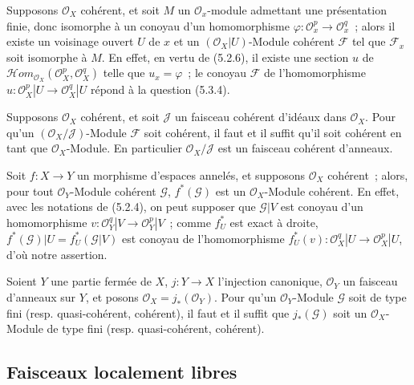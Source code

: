 \begin{env}[5.3.9]
\label{0.5.3.9-fr}
Supposons $\mathcal{O}_X$ cohérent, et soit $M$ un $\mathcal{O}_x$-module
admettant une présentation finie, donc isomorphe à un conoyau d'un
homomorphisme $\varphi:\mathcal{O}_x^p\to\mathcal{O}_x^q$~; alors il existe un
voisinage ouvert $U$ de $x$ et un $(\mathcal{O}_X|U)$-Module cohérent
$\mathcal{F}$ tel que $\mathcal{F}_x$ soit isomorphe à $M$. En effet, en vertu
de (5.2.6), il existe une section $u$ de
$\mathcal{H}\!om_{\mathcal{O}_X}(\mathcal{O}_X^p,\mathcal{O}_X^q)$ telle que $u_x=\varphi$~; le conoyau
$\mathcal{F}$ de l'homomorphisme
$u:\mathcal{O}_X^p|U\to\mathcal{O}_X^q|U$ répond à la question (5.3.4).
\end{env}

\begin{env}[5.3.10]
\label{0.5.3.10-fr}
Supposons $\mathcal{O}_X$ cohérent, et soit $\mathcal{J}$ un faisceau cohérent
d'idéaux dans $\mathcal{O}_X$. Pour qu'un
$(\mathcal{O}_X/\mathcal{J})$-Module $\mathcal{F}$ soit cohérent, il faut et il
suffit qu'il soit cohérent en tant que $\mathcal{O}_X$-Module. En particulier
$\mathcal{O}_X/\mathcal{J}$ est un faisceau cohérent d'anneaux.
\end{env}

\begin{env}[5.3.11]
\label{0.5.3.11-fr}
Soit $f:X\to Y$ un morphisme d'espaces annelés, et supposons
$\mathcal{O}_X$ cohérent~; alors, pour tout $\mathcal{O}_Y$-Module cohérent
$\mathcal{G}$, $f^*(\mathcal{G})$ est un $\mathcal{O}_X$-Module cohérent. En
effet, avec les notations de (5.2.4), on peut supposer que $\mathcal{G}|V$ est
conoyau d'un homomorphisme
$v:\mathcal{O}_Y^q|V\to\mathcal{O}_Y^p|V$~; comme $f_U^*$ est exact à droite,
$f^*(\mathcal{G})|U=f_U^*(\mathcal{G}|V)$ est conoyau de l'homomorphisme
$f_U^*(v):\mathcal{O}_X^q|U\to\mathcal{O}_X^p|U$, d'où notre assertion.
\end{env}

\begin{env}[5.3.12]
\label{0.5.3.12-fr}
Soient $Y$ une partie fermée de $X$, $j:Y\to X$ l'injection canonique,
$\mathcal{O}_Y$ un faisceau d'anneaux sur $Y$, et posons
$\mathcal{O}_X=j_*(\mathcal{O}_Y)$. Pour qu'un $\mathcal{O}_Y$-Module
$\mathcal{G}$ soit de type fini (resp. quasi-cohérent, cohérent), il faut et il
suffit que $j_*(\mathcal{G})$ soit un $\mathcal{O}_X$-Module de type fini
(resp. quasi-cohérent, cohérent).
\end{env}

\subsection{Faisceaux localement libres}
\label{subsection:0.5.4-fr}

